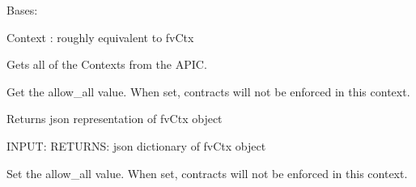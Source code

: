 \documentclass[letterpaper,10pt,english]{sphinxmanual}
\begin{document}
\begin{fulllineitems}
\label{acitoolkit:acitoolkit.Context}
Bases: {\hyperref[acibaseobject:acibaseobject.BaseACIObject]{}}

Context :  roughly equivalent to fvCtx

\begin{fulllineitems}
\label{acitoolkit:acitoolkit.Context.get}
Gets all of the Contexts from the APIC.

\end{fulllineitems}


\begin{fulllineitems}
\label{acitoolkit:acitoolkit.Context.get_allow_all}
Get the allow\_all value.
When set, contracts will not be enforced in this context.

\end{fulllineitems}


\begin{fulllineitems}
\label{acitoolkit:acitoolkit.Context.get_json}
Returns json representation of fvCtx object

INPUT:
RETURNS: json dictionary of fvCtx object

\end{fulllineitems}


\begin{fulllineitems}
\label{acitoolkit:acitoolkit.Context.set_allow_all}
Set the allow\_all value.
When set, contracts will not be enforced in this context.

\end{fulllineitems}


\end{fulllineitems}

\end{document}
